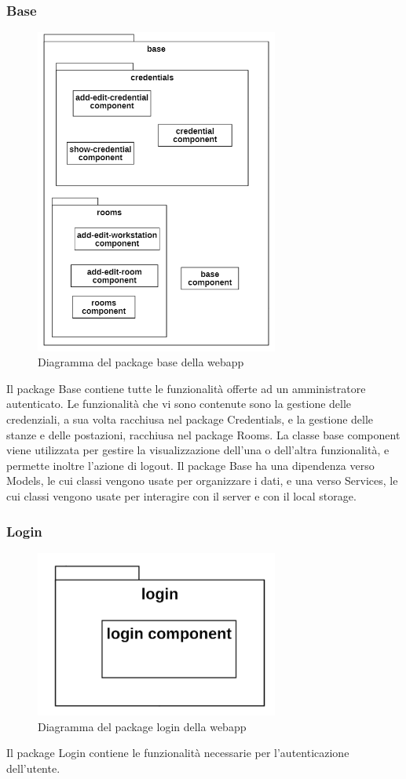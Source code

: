 \subsubsection{Base}
\begin{figure}[H]
	\centering
	\includegraphics[width=8cm]{res/images/webapp-base-diagrammaPackage.png}
	\caption{Diagramma del package base della webapp}
	\label{fig:DiagrammaPackageBaseWebapp}
\end{figure}
Il package Base contiene tutte le funzionalità offerte ad un amministratore autenticato.
Le funzionalità che vi sono contenute sono la gestione delle credenziali, a sua volta racchiusa nel package Credentials, e la gestione delle stanze e delle postazioni, racchiusa nel package Rooms. La classe base component viene utilizzata per gestire la visualizzazione dell'una o dell'altra funzionalità, e permette inoltre l'azione di logout.
Il package Base ha una dipendenza verso Models, le cui classi vengono usate per organizzare i dati, e una verso Services, le cui classi vengono usate per interagire con il server e con il local storage.

\subsubsection{Login}
\begin{figure}[H]
	\centering
	\includegraphics[width=8cm]{res/images/webapp-login-diagrammaPackage.png}
	\caption{Diagramma del package login della webapp}
	\label{fig:DiagrammaPackageLoginWebapp}
\end{figure}
Il package Login contiene le funzionalità necessarie per l'autenticazione dell'utente.

